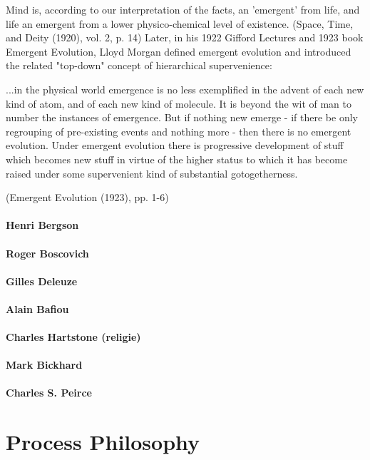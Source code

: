 \documentclass[a4paper]{Thesis}
\begin{document}
	Mind is, according to our interpretation of the facts, an 'emergent' from life, and life an emergent from a lower physico-chemical level of existence.
	(Space, Time, and Deity (1920), vol. 2, p. 14)
	Later, in his 1922 Gifford Lectures and 1923 book Emergent Evolution, Lloyd Morgan defined emergent evolution and introduced the related "top-down" concept of hierarchical supervenience:
	
	...in the physical world emergence is no less exemplified in the advent of each new kind of atom, and of each new kind of molecule. It is beyond the wit of man to number the instances of emergence. But if nothing new emerge - if there be only regrouping of pre-existing events and nothing more - then there is no emergent evolution.
	Under emergent evolution there is progressive development of stuff which becomes new stuff in virtue of the higher status to which it has become raised under some supervenient kind of substantial gotogetherness.
	
	(Emergent Evolution (1923), pp. 1-6)
	
	\subsubsection{Henri Bergson}
	\subsubsection{Roger Boscovich}
	\subsubsection{Gilles Deleuze}
	\subsubsection{Alain Bafiou}
	\subsubsection{Charles Hartstone (religie)}
	\subsubsection{Mark Bickhard}
	\subsubsection{Charles S. Peirce}


\chapter{Process Philosophy}
\end{document}
